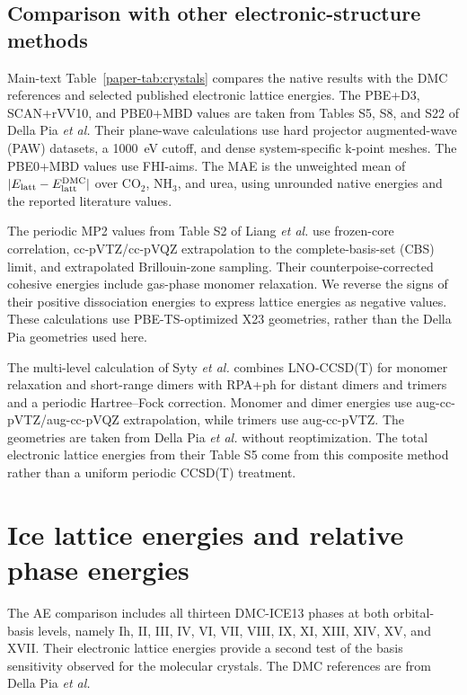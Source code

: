 \documentclass[10pt,a4paper]{article}
\begin{document}
\subsection{Comparison with other electronic-structure methods}
\label{sec:crystal-literature}

Main-text Table~\ref{paper-tab:crystals} compares the native results with the DMC references and selected published electronic lattice energies. The PBE+D3, SCAN+rVV10, and PBE0+MBD values are taken from Tables S5, S8, and S22 of Della Pia \emph{et al.}\cite{DellaPia2025MLIP} Their plane-wave calculations use hard projector augmented-wave (PAW) datasets, a 1000~eV cutoff, and dense system-specific k-point meshes. The PBE0+MBD values use FHI-aims. The MAE is the unweighted mean of $|E_{\rm latt}-E_{\rm latt}^{\rm DMC}|$ over CO$_2$, NH$_3$, and urea, using unrounded native energies and the reported literature values.


The periodic MP2 values from Table S2 of Liang \emph{et al.}\cite{Liang2023CrystalMP2} use frozen-core correlation, cc-pVTZ/cc-pVQZ extrapolation to the complete-basis-set (CBS) limit, and extrapolated Brillouin-zone sampling. Their counterpoise-corrected cohesive energies include gas-phase monomer relaxation. We reverse the signs of their positive dissociation energies to express lattice energies as negative values. These calculations use PBE-TS-optimized X23 geometries, rather than the Della Pia geometries used here.

The multi-level calculation of Syty \emph{et al.}\cite{Syty2025CrystalCC} combines LNO-CCSD(T) for monomer relaxation and short-range dimers with RPA+ph for distant dimers and trimers and a periodic Hartree--Fock correction. Monomer and dimer energies use aug-cc-pVTZ/aug-cc-pVQZ extrapolation, while trimers use aug-cc-pVTZ. The geometries are taken from Della Pia \emph{et al.} without reoptimization. The total electronic lattice energies from their Table S5 come from this composite method rather than a uniform periodic CCSD(T) treatment.



\FloatBarrier

\section{Ice lattice energies and relative phase energies}
\label{sec:ice-basis}

The AE comparison includes all thirteen DMC-ICE13 phases at both orbital-basis levels, namely Ih, II, III, IV, VI, VII, VIII, IX, XI, XIII, XIV, XV, and XVII. Their electronic lattice energies provide a second test of the basis sensitivity observed for the molecular crystals. The DMC references are from Della Pia \emph{et al.}\cite{DellaPia2022Ice}
\end{document}
